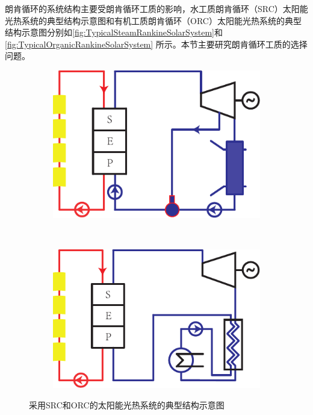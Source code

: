 朗肯循环的系统结构主要受朗肯循环工质的影响，水工质朗肯循环（SRC）太阳能光热系统的典型结构示意图和有机工质朗肯循环（ORC）太阳能光热系统的典型结构示意图分别如\autoref{fig:TypicalSteamRankineSolarSystem}和\autoref{fig:TypicalOrganicRankineSolarSystem}
所示。本节主要研究朗肯循环工质的选择问题。

\begin{figure}[htbp]
\centering
	\begin{subfigure}[b]{0.4\columnwidth}
	\includegraphics[width = \columnwidth]{fig/TypicalSteamRankineSolarSystem}
	\caption{}\label{fig:TypicalSteamRankineSolarSystem}
	\end{subfigure}
	~
\begin{subfigure}[b]{0.4\columnwidth}
	\includegraphics[width = \columnwidth]{fig/TypicalOrganicRankineSolarSystem}
	\caption{}\label{fig:TypicalOrganicRankineSolarSystem}
	\end{subfigure}
	\caption{采用SRC和ORC的太阳能光热系统的典型结构示意图}
	\label{fig:TwoTypesOfRankineCycle}
\end{figure}


